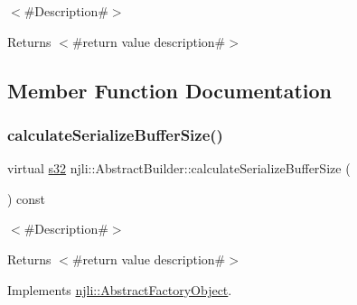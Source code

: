 $<$\#\+Description\#$>$

\begin{DoxyReturn}{Returns}
$<$\#return value description\#$>$ 
\end{DoxyReturn}


\subsection{Member Function Documentation}
\mbox{\label{classnjli_1_1_abstract_builder_aa1d220053e182c37b31b427499c6eacf}} 
\subsubsection{\texorpdfstring{calculate\+Serialize\+Buffer\+Size()}{calculateSerializeBufferSize()}}
{\footnotesize\ttfamily virtual \mbox{\hyperlink{_util_8h_aa62c75d314a0d1f37f79c4b73b2292e2}{s32}} njli\+::\+Abstract\+Builder\+::calculate\+Serialize\+Buffer\+Size (\begin{DoxyParamCaption}{ }\end{DoxyParamCaption}) const\hspace{0.3cm}{\ttfamily [pure virtual]}}

$<$\#\+Description\#$>$

\begin{DoxyReturn}{Returns}
$<$\#return value description\#$>$ 
\end{DoxyReturn}


Implements \mbox{\hyperlink{classnjli_1_1_abstract_factory_object_a4763d05bc9dc37c559111f8bb30e1dd8}{njli\+::\+Abstract\+Factory\+Object}}.



